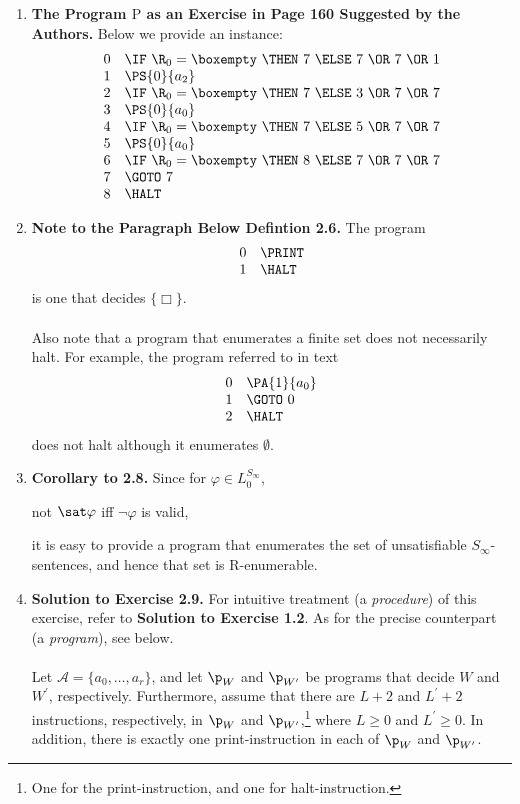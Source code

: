 \begin{enumerate}[1.]
\item \textbf{The Program $\mathrm{P}$ as an Exercise in Page 160 Suggested by the Authors.} Below we provide an instance:
\[
\begin{array}{rl}
0 & \IF \ \R_0 = \boxempty \ \THEN \ 7 \ \ELSE \ 7 \ \OR \ 7 \ \OR \ 1 \cr
1 & \PS{0}{a_2} \cr
2 & \IF \ \R_0 = \boxempty \ \THEN \ 7 \ \ELSE \ 3 \ \OR \ 7 \ \OR \ 7 \cr
3 & \PS{0}{a_0} \cr
4 & \IF \ \R_0 = \boxempty \ \THEN \ 7 \ \ELSE \ 5 \ \OR \ 7 \ \OR \ 7 \cr
5 & \PS{0}{a_0} \cr
6 & \IF \ \R_0 = \boxempty \ \THEN \ 8 \ \ELSE \ 7 \ \OR \ 7 \ \OR \ 7 \cr
7 & \GOTO \ 7 \cr
8 & \HALT
\end{array}
\]
%
\item \textbf{Note to the Paragraph Below Defintion 2.6.} The program
\[
\begin{array}{rl}
0 & \PRINT \cr
1 & \HALT
\end{array}
\]
is one that decides $\{ \Box \}$.\\
\ \\
Also note that a program that enumerates a finite set does not necessarily halt. For example, the program referred to in text
\[
\begin{array}{rl}
0 & \PA{1}{a_0} \cr
1 & \GOTO \ 0 \cr
2 & \HALT
\end{array}
\]
does not halt although it enumerates $\emptyset$.
%
\item \textbf{Corollary to 2.8.} Since for $\varphi \in L_0^{S_\infty}$,
\begin{center}
not $\sat \varphi$ iff $\neg \varphi$ is valid,
\end{center}
it is easy to provide a program that enumerates the set of unsatisfiable $S_\infty$-sentences, and hence that set is R-enumerable.
%
\item \textbf{Solution to Exercise 2.9.} For intuitive treatment (a \emph{procedure}) of this exercise, refer to \textbf{Solution to Exercise 1.2}. As for the precise counterpart (a \emph{program}), see below.\\
\ \\
Let $\mathcal{A} = \{ a_0, \ldots, a_r \}$, and let $\p_W$ and $\p_{W^\prime}$ be programs that decide $W$ and $W^\prime$, respectively. Furthermore, assume that there are $L + 2$ and $L^\prime + 2$ instructions, respectively, in $\p_W$ and $\p_{W^\prime}$,\footnote{One for the print-instruction, and one for halt-instruction.} where $L \geq 0$ and $L^\prime \geq 0$. In addition, there is exactly one print-instruction in each of $\p_W$ and $\p_{W^\prime}$.\\

\end{enumerate}
